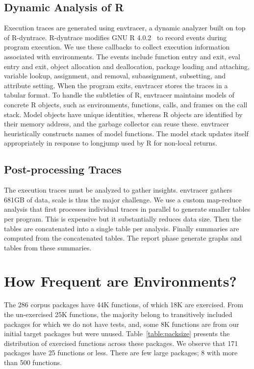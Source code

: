 \documentclass[10pt,review,sigplan,authorversion=true]{acmart}
\newcommand{\envtracer}{{\sf envtracer}\xspace}
\newcommand{\rdyntrace}{{\sf R-dyntrace}\xspace}
\begin{document}
\subsection{Dynamic Analysis of R}

Execution traces are generated using \envtracer, a dynamic analyzer built on top
of \rdyntrace. \rdyntrace modifies GNU R 4.0.2~\cite{oopsla19b} to record events
during program execution. We use these callbacks to collect execution
information associated with environments. The events include function entry and
exit, eval entry and exit, object allocation and deallocation, package loading
and attaching, variable lookup, assignment, and removal, subassignment,
subsetting, and attribute setting. When the program exits, \envtracer stores the
traces in a tabular format. To handle the subtleties of R, \envtracer maintains
models of concrete R objects, such as environments, functions, calls, and frames
on the call stack. Model objects have unique identities, whereas R objects are
identified by their memory address, and the garbage collector can reuse these.
\envtracer heuristically constructs names of model functions. The model stack
updates itself appropriately in response to longjump used by R for non-local
returns.

\subsection{Post-processing Traces}

The execution traces must be analyzed to gather insights. \envtracer gathers
681GB of data, scale is thus the major challenge. We use a custom map-reduce
analysis that first processes individual traces in parallel to generate smaller
tables per program. This is expensive but it substantially reduces data size.
Then the tables are concatenated into a single table per analysis. Finally
summaries are computed from the concatenated tables. The report phase generate
graphs and tables from these summaries.

\section{How Frequent are Environments?}

The 286 corpus packages have 44K functions, of which 18K are exercised. From the
un-exercised 25K functions, the majority belong to transitively included
packages for which we do not have tests, and, some 8K functions are from our
initial target packages but were unused. Table~\ref{table:packsize} presents the
distribution of exercised functions across these packages. We observe that 171
packages have 25 functions or less. There are few large packages; 8 with more
than 500 functions.
\end{document}
